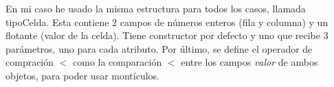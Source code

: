 En mi caso he usado la misma estructura para todos los casos, llamada tipoCelda. Esta contiene 2 campos de números enteros (fila y columna) y un flotante (valor de la celda). Tiene constructor por defecto y uno que recibe 3 parámetros, uno para cada atributo. Por último, se define el operador de compración $<$ como la comparación $<$ entre los campos \emph{valor} de ambos objetos, para poder usar montículos.
